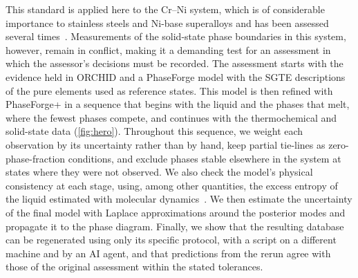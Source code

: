 This standard is applied here to the Cr--Ni system, which is of considerable importance to stainless steels and Ni-base superalloys and has been assessed several times~\cite{lee1992,hao2021,kunselman2026hmc}. Measurements of the solid-state phase boundaries in this system, however, remain in conflict, making it a demanding test for an assessment in which the assessor's decisions must be recorded. The assessment starts with the evidence held in ORCHID and a PhaseForge model with the SGTE descriptions of the pure elements used as reference states. This model is then refined with PhaseForge+ in a sequence that begins with the liquid and the phases that melt, where the fewest phases compete, and continues with the thermochemical and solid-state data (\cref{fig:hero}). Throughout this sequence, we weight each observation by its uncertainty rather than by hand, keep partial tie-lines as zero-phase-fraction conditions, and exclude phases stable elsewhere in the system at states where they were not observed. We also check the model's physical consistency at each stage, using, among other quantities, the excess entropy of the liquid estimated with molecular dynamics~\cite{hong2025entropy}. We then estimate the uncertainty of the final model with Laplace approximations around the posterior modes and propagate it to the phase diagram. Finally, we show that the resulting database can be regenerated using only its specific protocol, with a script on a different machine and by an AI agent, and that predictions from the rerun agree with those of the original assessment within the stated tolerances.
